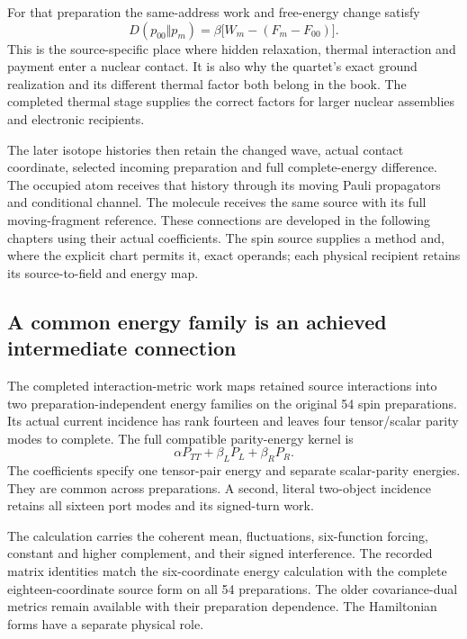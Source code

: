 For that preparation the same-address work and free-energy change satisfy
\begin{equation}
 D(p_{00}\Vert p_m)=\beta\big[W_m-(F_m-F_{00})\big].
\end{equation}
This is the source-specific place where hidden relaxation, thermal interaction and payment enter a nuclear contact. It is also why the quartet's exact ground realization and its different thermal factor both belong in the book. The completed thermal stage supplies the correct factors for larger nuclear assemblies and electronic recipients.

The later isotope histories then retain the changed wave, actual contact coordinate, selected incoming preparation and full complete-energy difference. The occupied atom receives that history through its moving Pauli propagators and conditional channel. The molecule receives the same source with its full moving-fragment reference. These connections are developed in the following chapters using their actual coefficients. The spin source supplies a method and, where the explicit chart permits it, exact operands; each physical recipient retains its source-to-field and energy map.

\subsection{A common energy family is an achieved intermediate connection}

The completed interaction-metric work maps retained source interactions into two preparation-independent energy families on the original 54 spin preparations. Its actual current incidence has rank fourteen and leaves four tensor/scalar parity modes to complete. The full compatible parity-energy kernel is
\begin{equation}
 \alpha P_{TT}+\beta_LP_L+\beta_RP_R.
\end{equation}
The coefficients specify one tensor-pair energy and separate scalar-parity energies. They are common across preparations. A second, literal two-object incidence retains all sixteen port modes and its signed-turn work.

The calculation carries the coherent mean, fluctuations, six-function forcing, constant and higher complement, and their signed interference. The recorded matrix identities match the six-coordinate energy calculation with the complete eighteen-coordinate source form on all 54 preparations. The older covariance-dual metrics remain available with their preparation dependence. The Hamiltonian forms have a separate physical role.

